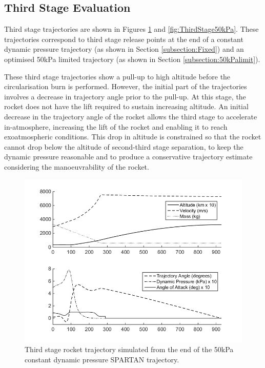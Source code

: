 \documentclass[]{aiaa-tc}
\begin{document}
 
\subsection{Third Stage Evaluation}

Third stage trajectories are shown in Figures \ref{fig:ThirdStageConstQ} and \ref{fig:ThirdStage50kPa}. 
These trajectories correspond to third stage release points at the end of a constant dynamic pressure trajectory (as shown in Section \ref{subsection:Fixed}) and an optimised 50kPa limited trajectory  (as shown in Section \ref{subsection:50kPalimit}). 

These third stage trajectories show a pull-up to high altitude before the circularisation burn is performed. 
However, the initial part of the trajectories involves a decrease in trajectory angle prior to the pull-up. At this stage, the rocket does not have the lift required to sustain increasing altitude. 
An initial decrease in the trajectory angle of the rocket allows the third stage to accelerate in-atmosphere, increasing the lift of the rocket and enabling it to reach exoatmospheric conditions. 
This drop in altitude is constrained so that the rocket cannot drop below the altitude of second-third stage separation, to keep the dynamic pressure reasonable and to produce a conservative trajectory estimate considering the manoeuvrability of the rocket.
\begin{figure}[H]
	\centering
	\includegraphics[width=0.8\linewidth]{ThirdStageConstQ}
	\caption{Third stage rocket trajectory simulated from the end of the 50kPa constant dynamic pressure SPARTAN trajectory.}
	\label{fig:ThirdStageConstQ}
\end{figure}
\end{document}
